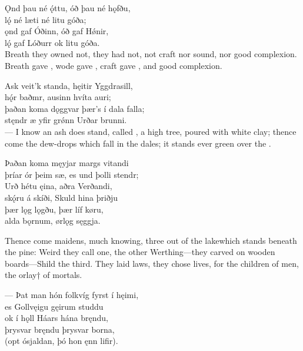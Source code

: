 \bva Ǫnd þau né ǫ́ttu, \hld óð þau né hǫfðu, \\%
lǫ́ né læti \hld né litu góða; \\%
ǫnd gaf Óðinn, \hld óð gaf Hǿnir, \\%
lǫ́ gaf Lóðurr \hld ok litu góða.\\%

\bva Breath they owned not,  they had not, not craft nor sound, nor good complexion. Breath gave , wode gave , craft gave , and good complexion.

\bva Ask veit'k standa, \hld hęitir Yggdrasill, \\%
hǫ́r baðmr, ausinn \hld hvíta auri; \\%
þaðan koma dǫggvar \hld þær's í dala falla; \\%
stęndr æ yfir grǿnn \hld Urðar brunni.\\%

— I know an ash does stand, called , a high tree, poured with white clay\footnotemark[1]; thence come the dew-drops which fall in the dales; it stands ever green over the .

\bva Þaðan koma męyjar \hld margs vitandi \\%
þríar ór þeim sæ\footnotemark[1], \hld es und þolli stendr; \\%
Urð hétu ęina, \hld aðra Verðandi, \\%
skǫ́ru á skíði, \hld Skuld hina þriðju \\%
þær lǫg lǫgðu, \hld þær líf køru, \\%
alda bǫrnum, \hld ørlǫg sęggja.\\%

Thence come maidens, much knowing, three out of the lake\footnotemark[1] which stands beneath the pine\footnotemark[2]: Weird they call one, the other Werthing—they carved on wooden boards—Shild the third. They laid laws, they chose lives, for the children of men, the orlay† of mortals.

\bva — Þat man hón folkvíg \hld fyrst í hęimi, \\%
es Gollvęigu \hld gęirum studdu \\%
ok í hǫll Háars \hld hána bręndu, \\%
þrysvar bręndu \hld þrysvar borna, \\%
(opt ósjaldan, \hld þó hon ęnn lifir).\footnotemark[1]\\%

